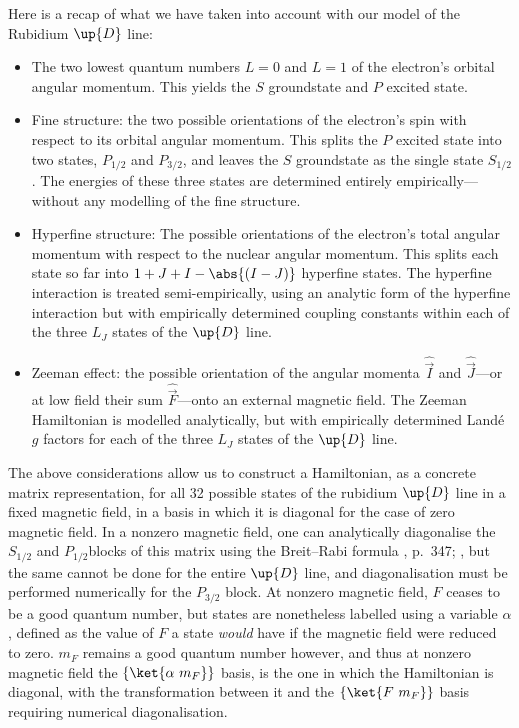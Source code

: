 Here is a recap of what we have taken into account with our model of the Rubidium $\up{D}$ line:
\begin{itemize}
    \item The two lowest quantum numbers $L=0$ and $L=1$ of the electron's orbital angular momentum. This yields the $S$ groundstate and $P$ excited state.
    \item Fine structure: the two possible orientations of the electron's spin with respect to its orbital angular momentum. This splits the $P$ excited state into two states, $P_{1/2}$ and $P_{3/2}$, and leaves the $S$ groundstate as the single state $S_{1/2}$. The energies of these three states are determined entirely empirically---without any modelling of the fine structure.
    \item Hyperfine structure: The possible orientations of the electron's total angular momentum with respect to the nuclear angular momentum. This splits each state so far into $1+J+I - \abs{(I - J)}$ hyperfine states. The hyperfine interaction is treated semi-empirically, using an analytic form of the hyperfine interaction but with empirically determined coupling constants within each of the three $L_J$ states of the $\up{D}$ line. 
    \item Zeeman effect: the possible orientation of the angular momenta $\hat{\vec I}$ and $\hat{\vec J}$---or at low field their sum $\hat{\vec F}$---onto an external magnetic field. The Zeeman Hamiltonian is modelled analytically, but with empirically determined Land\'e $g$ factors for each of the three $L_J$ states of the $\up{D}$ line. 
\end{itemize}

The above considerations allow us to construct a Hamiltonian, as a concrete matrix representation, for all 32 possible states of the rubidium $\up{D}$ line in a fixed magnetic field, in a basis in which it is diagonal for the case of zero magnetic field. In a nonzero magnetic field, one can analytically diagonalise the $S_{1/2}$ and $P_{1/2}$blocks of this matrix using the Breit--Rabi formula
\citeleft{}, p.~347; \citeright, but the same cannot be done for the entire $\up{D}$ line, and diagonalisation must be performed numerically for the $P_{3/2}$ block. At nonzero magnetic field, $F$ ceases to be a good quantum number, but states are nonetheless labelled using a variable $\alpha$, defined as the value of $F$ a state \emph{would} have if the magnetic field were reduced to zero. $m_F$ remains a good quantum number however, and thus at nonzero magnetic field the $\{\ket{\alpha\ m_F}\}$ basis, is the one in which the Hamiltonian is diagonal, with the transformation between it and the $\{\ket{F\ m_F}\}$ basis requiring numerical diagonalisation.

